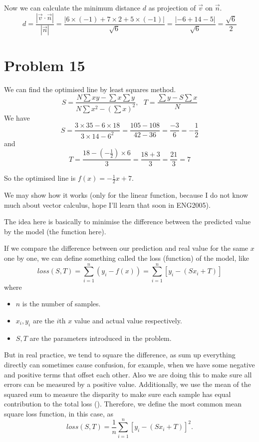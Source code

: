 \documentclass[12pt,a4paper]{article}
\begin{document}
Now we can calculate the minimum distance $d$ as projection of $\vec{v} \text{ on } \vec{n}$.
\[
d = \frac{|\vec{v}\cdot \vec{n}|}{|\vec{n}|} 
= \frac{|6\times(-1) + 7 \times 2 + 5\times (-1)|}{\sqrt{6}}
= \frac{|-6+14-5|}{\sqrt{6}} = \frac{\sqrt{6}}{2}
\]

\section*{Problem 15}
\begin{solution}
    We can find the optimised line by least squares method.
    \[
    S=\frac{N \sum x y-\sum x \sum y}{N \sum x^2-\left(\sum x\right)^2}, 
    \text{     }
    T=\frac{\sum y-S \sum x}{N}
    \]
We have
$$
S=\frac{3 \times 35-6 \times 18}{3 \times 14-6^2}=\frac{105-108}{42-36}=\frac{-3}{6}=-\frac{1}{2}
$$
and
$$
T=\frac{18-\left(-\frac{1}{2}\right) \times 6}{3}=\frac{18+3}{3}=\frac{21}{3}=7
$$

So the optimised line is $f(x) = -\frac{1}{2}x + 7$.

\begin{remark}
We may show how it works (only for the linear function, because I do not know much about vector calculus, hope I'll learn that soon in ENG2005).

The idea here is basically to minimise the difference between the predicted value by the model (the function here).

If we compare the difference between our prediction and real value for the same $x$ one by one, we can define something called the loss (function) of the model, like
\[
loss(S,T) = \sum_{i=1}^n(y_i-f(x)) = \sum_{i=1}^n[y_i- (Sx_i + T)]
\]
where
\begin{itemize}
    \item $n$ is the number of samples.
    \item $x_i, y_i$ are the $i$th $x$ value and actual value respectively.
    \item $S, T$ are the parameters introduced in the problem.
\end{itemize}

But in real practice, we tend to square the difference, as sum up everything directly can sometimes cause confusion, for example, when we have some negative and positive terms that offset each other. Also we are doing this to make sure all errors can be measured by a positive value. Additionally, we use the mean of the squared sum to measure the disparity to make sure each sample has equal contribution to the total loss (\cite{zhou_machine_2021}). Therefore, we define the most common mean square loss function, in this case, as
\[
loss(S,T) = \frac{1}{n}\sum_{i=1}^n[y_i- (Sx_i + T)]^2.
\]


\end{remark}
\end{solution}
\end{document}
